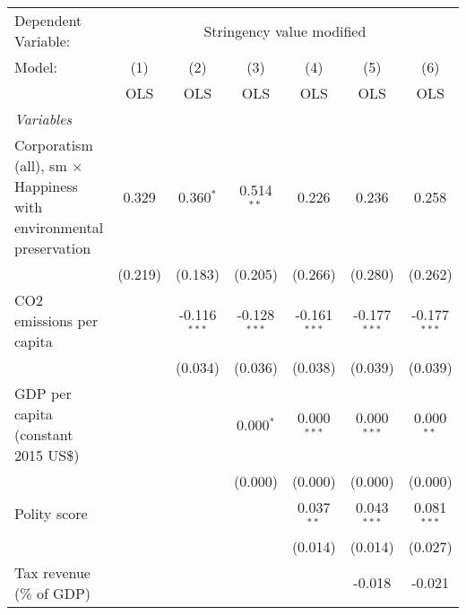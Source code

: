 
\begingroup
\centering
\begin{tabular}{lcccccc}
   \toprule
   Dependent Variable: & \multicolumn{6}{c}{Stringency value modified}\\
   Model:                                                                    & (1)     & (2)            & (3)            & (4)            & (5)            & (6)\\  
                                                                             &  OLS    & OLS            & OLS            & OLS            & OLS            & OLS\\  
   \midrule
   \emph{Variables}\\
   Corporatism (all), sm $\times$ Happiness with environmental preservation  & 0.329   & 0.360$^{*}$    & 0.514$^{**}$   & 0.226          & 0.236          & 0.258\\   
                                                                             & (0.219) & (0.183)        & (0.205)        & (0.266)        & (0.280)        & (0.262)\\   
   CO2 emissions per capita                                                  &         & -0.116$^{***}$ & -0.128$^{***}$ & -0.161$^{***}$ & -0.177$^{***}$ & -0.177$^{***}$\\   
                                                                             &         & (0.034)        & (0.036)        & (0.038)        & (0.039)        & (0.039)\\   
   GDP per capita (constant 2015 US\$)                                       &         &                & 0.000$^{*}$    & 0.000$^{***}$  & 0.000$^{***}$  & 0.000$^{**}$\\   
                                                                             &         &                & (0.000)        & (0.000)        & (0.000)        & (0.000)\\   
   Polity score                                                              &         &                &                & 0.037$^{**}$   & 0.043$^{***}$  & 0.081$^{***}$\\   
                                                                             &         &                &                & (0.014)        & (0.014)        & (0.027)\\   
   Tax revenue (\% of GDP)                                                   &         &                &                &                & -0.018         & -0.021\\   

\end{tabular}
